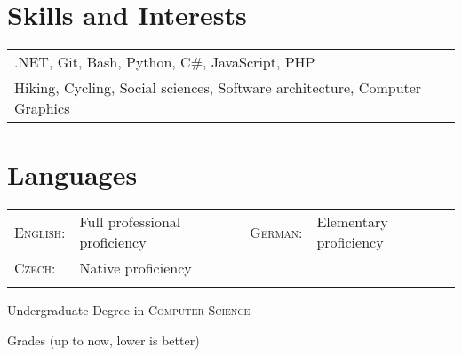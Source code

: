 \documentclass[a4paper,10pt]{article}
\newcommand{\comment}[2]{#2}
\begin{document}
\section{Skills and Interests}
\begin{tabular}{l} 
.NET, Git, Bash, Python, C\#, JavaScript, PHP \\
Hiking, Cycling, Social sciences, Software architecture, Computer Graphics \\
\end{tabular}

\section{Languages}
\begin{tabular}{llll}
\textsc{English:} & Full professional proficiency &
\textsc{German:} & Elementary proficiency \\
\textsc{Czech:} & Native proficiency \\&
\end{tabular}


\newpage
\par{\centering\Large \hypertarget{bscMFF}{Undergraduate \comment{Bachelor of Science}  Degree in \textsc{Computer Science}}\par}\large{\centering Grades (up to now, lower is better)\par}\normalsize
\end{document}
